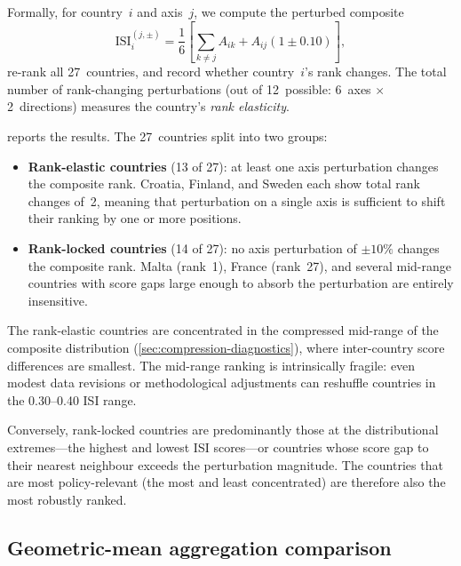 Formally, for country~$i$ and axis~$j$, we compute the perturbed
composite
\begin{equation}\label{eq:rank-elasticity}
  \text{ISI}_i^{(j,\pm)} = \frac{1}{6}\left[
    \sum_{k \neq j} A_{ik} + A_{ij}(1 \pm 0.10)
  \right],
\end{equation}
re-rank all 27~countries, and record whether country~$i$'s rank
changes.  The total number of rank-changing perturbations (out of
12~possible: 6~axes $\times$ 2~directions) measures the country's
\emph{rank elasticity}.



 reports the results.  The 27~countries
split into two groups:

\begin{itemize}[leftmargin=2em]
  \item \textbf{Rank-elastic countries} (13 of 27):
    at least one axis perturbation changes the composite rank.
    Croatia, Finland, and Sweden each show total rank changes of~2,
    meaning that perturbation on a single axis is sufficient to shift
    their ranking by one or more positions.

  \item \textbf{Rank-locked countries} (14 of 27):
    no axis perturbation of $\pm 10\%$ changes the composite rank.
    Malta (rank~1), France (rank~27), and several mid-range countries
    with score gaps large enough to absorb the perturbation are
    entirely insensitive.
\end{itemize}

The rank-elastic countries are concentrated in the compressed
mid-range of the composite distribution
(\cref{sec:compression-diagnostics}), where inter-country score
differences are smallest.  The mid-range ranking
is intrinsically fragile: even modest data revisions or methodological
adjustments can reshuffle countries in the 0.30--0.40 ISI range.

Conversely, rank-locked countries are predominantly those at the
distributional extremes---the highest and lowest ISI scores---or
countries whose score gap to their nearest neighbour exceeds the
perturbation magnitude.  The countries that are most policy-relevant
(the most and least concentrated) are therefore also the most
robustly ranked.

\subsection{Geometric-mean aggregation comparison}\label{sec:geometric-mean}


